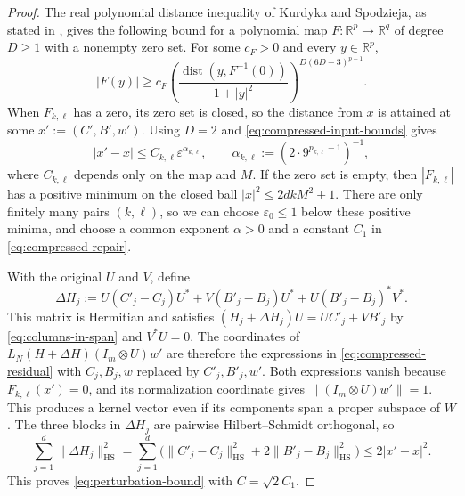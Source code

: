 \begin{proof}
The real polynomial distance inequality of Kurdyka and Spodzieja, as stated in \cite[p.~2, \textup{(KS2)}]{KSS16}, gives the following bound for a polynomial map $F:\mathbb R^p\to\mathbb R^q$ of degree $D\ge1$ with a nonempty zero set.
For some $c_F>0$ and every $y\in\mathbb R^p$,
\[
 |F(y)|\ge c_F
 \left(\frac{\operatorname{dist}(y,F^{-1}(0))}{1+|y|^2}\right)^{D(6D-3)^{p-1}}.
\]
When $F_{k,\ell}$ has a zero, its zero set is closed, so the distance from $x$ is attained at some $x':=(C',B',w')$.
Using $D=2$ and \eqref{eq:compressed-input-bounds} gives
\begin{equation}\label{eq:compressed-repair}
 |x'-x|\le C_{k,\ell}\varepsilon^{\alpha_{k,\ell}},
 \qquad
 \alpha_{k,\ell}:=(2\cdot 9^{p_{k,\ell}-1})^{-1},
\end{equation}
where $C_{k,\ell}$ depends only on the map and $M$.
If the zero set is empty, then $|F_{k,\ell}|$ has a positive minimum on the closed ball $|x|^2\le 2dkM^2+1$.
There are only finitely many pairs $(k,\ell)$, so we can choose $\varepsilon_0\le1$ below these positive minima, and choose a common exponent $\alpha>0$ and a constant $C_1$ in \eqref{eq:compressed-repair}.

With the original $U$ and $V$, define
\[
 \Delta H_j:=U(C'_j-C_j)U^*+V(B'_j-B_j)U^*+U(B'_j-B_j)^*V^*.
\]
This matrix is Hermitian and satisfies $(H_j+\Delta H_j)U=UC'_j+VB'_j$ by \eqref{eq:columns-in-span} and $V^*U=0$.
The coordinates of $L_N(H+\Delta H)(I_m\otimes U)w'$ are therefore the expressions in \eqref{eq:compressed-residual} with $C_j,B_j,w$ replaced by $C'_j,B'_j,w'$.
Both expressions vanish because $F_{k,\ell}(x')=0$, and its normalization coordinate gives $\|(I_m\otimes U)w'\|=1$.
This produces a kernel vector even if its components span a proper subspace of $W$.
The three blocks in $\Delta H_j$ are pairwise Hilbert--Schmidt orthogonal, so
\[
 \sum_{j=1}^d\|\Delta H_j\|_{\mathrm{HS}}^2
 =\sum_{j=1}^d\big(\|C'_j-C_j\|_{\mathrm{HS}}^2
                  +2\|B'_j-B_j\|_{\mathrm{HS}}^2\big)
 \le 2|x'-x|^2.
\]
This proves \eqref{eq:perturbation-bound} with $C=\sqrt{2}C_1$.
\end{proof}
